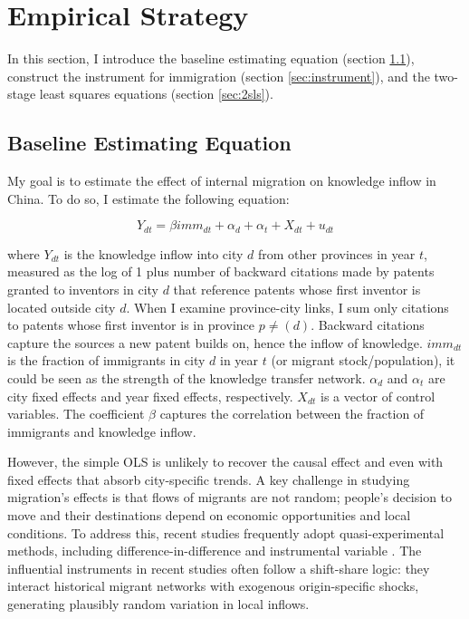 \documentclass[12pt]{article}
\begin{document}
\section{Empirical Strategy} \label{sec:empirical} 

In this section, I introduce the baseline estimating equation (section \ref{sec:baseline}), construct the instrument for immigration (section \ref{sec:instrument}), and the two-stage least squares equations (section \ref{sec:2sls}).

\subsection{Baseline Estimating Equation}\label{sec:baseline}

My goal is to estimate the effect of internal migration on knowledge inflow in China. To do so, I estimate the following equation: 

\begin{equation}
 Y_{dt}=\beta imm_{dt}+\alpha_d+\alpha_t+X_{dt}+u_{dt}
\end{equation}

where $Y_{dt}$ is the knowledge inflow into city $d$ from other provinces in year $t$, measured as the log of 1 plus number of backward citations made by patents granted to inventors in city $d$ that reference patents whose first inventor is located outside city $d$. When I examine province-city links, I sum only citations to patents whose first inventor is in province $p\neq \text{}(d)$. Backward citations capture the sources a new patent builds on, hence the inflow of knowledge. $imm_{dt}$ is the fraction of immigrants in city $d$ in year $t$ (or migrant stock/population), it could be seen as the strength of the knowledge transfer network. $\alpha_d$ and $\alpha_t$ are city fixed effects and year fixed effects, respectively. $X_{dt}$ is a vector of control variables. The coefficient $\beta$ captures the correlation between the fraction of immigrants and knowledge inflow.

However, the simple OLS is unlikely to recover the causal effect and even with fixed effects that absorb city-specific trends. A key challenge in studying migration's effects is that flows of migrants are not random; people's decision to move and their destinations depend on economic opportunities and local conditions. To address this, recent studies frequently adopt quasi-experimental methods, including difference-in-difference \citep{fogedImmigrantsEffectNative2016,bernsteinContributionHighSkilledImmigrants2022a} and instrumental variable \citep{cardImmigrantInflowsNative2001,lewisImmigrationSkillMix2011,tabelliniGiftsImmigrantsWoes2019,dustmannFreeMovementOpen2019,giulianoSeedsIdeologyHistorical2020}. The influential instruments in recent studies often follow a shift-share logic: they interact historical migrant networks with exogenous origin-specific shocks, generating plausibly random variation in local inflows. 
\end{document}
